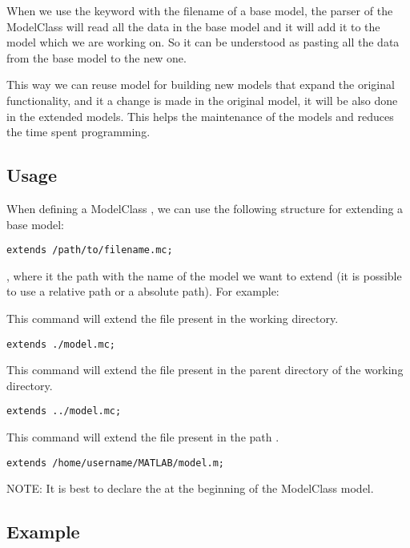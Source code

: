 \documentclass[11pt]{article}
\begin{document}
When we use the keyword  with the filename of a base model, the parser of the ModelClass will read all the data in the base model and it will add it to the model which we are working on. So it can be understood as pasting all the data from the base model to the new one.

This way we can reuse model for building new models that expand the original functionality, and it a change is made in the original model, it will be also done in the extended models. This helps the maintenance of the models and reduces the time spent programming.

\subsection{Usage}

When defining a ModelClass , we can use the following structure for extending a base model:

\begin{lstlisting}
extends /path/to/filename.mc;
\end{lstlisting}

, where  it the path with the name of the model we want to extend (it is possible to use a relative path or a absolute path). For example:

This command will extend the file  present in the working directory.

\begin{lstlisting}
extends ./model.mc;
\end{lstlisting}

This command will extend the file  present in the parent directory of the working directory.

\begin{lstlisting}
extends ../model.mc;
\end{lstlisting}

This command will extend the file  present in the path .

\begin{lstlisting}
extends /home/username/MATLAB/model.m;
\end{lstlisting}

NOTE: It is best to declare the  at the beginning of the ModelClass model.

\subsection{Example}
\end{document}
